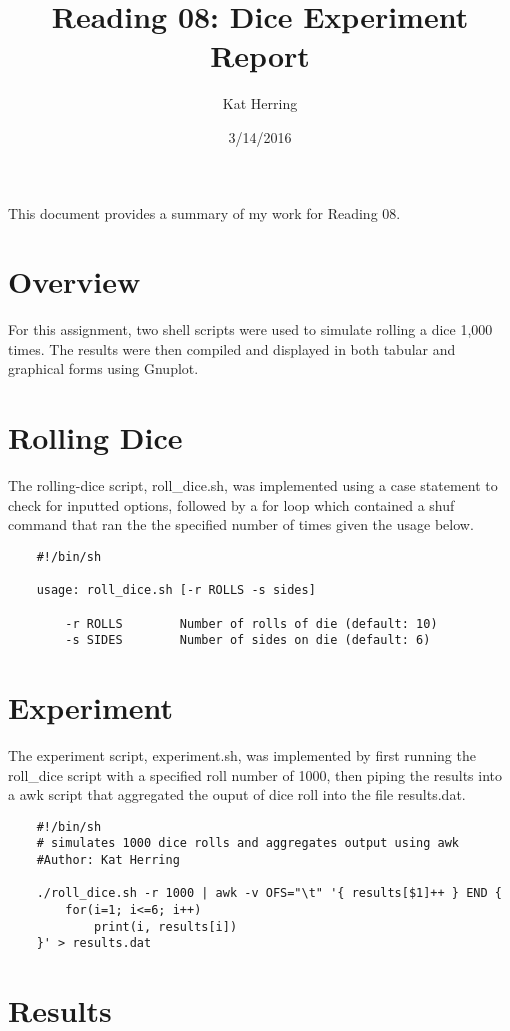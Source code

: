 \documentclass[letterpaper]{article}
\title{Reading 08: Dice Experiment Report}
\date{3/14/2016}
\author{Kat Herring}
\begin{document}
\maketitle

This document provides a summary of my work for Reading 08.

\section{Overview}

For this assignment, two shell scripts were used to simulate rolling a dice 1,000 times. The results were then compiled and displayed in both tabular and graphical forms using Gnuplot.

\section{Rolling Dice}

The rolling-dice script, roll\_dice.sh, was implemented using a case statement to check for inputted options, followed by a for loop which contained a shuf command that ran the the specified number of times given the usage below.

\begin{verbatim}
	#!/bin/sh

	usage: roll_dice.sh [-r ROLLS -s sides]

	    -r ROLLS        Number of rolls of die (default: 10)
	    -s SIDES        Number of sides on die (default: 6)
\end{verbatim}

\section{Experiment}

The experiment script, experiment.sh, was implemented by first running the roll\_dice script with a specified roll number of 1000, then piping the results into a awk script that aggregated the ouput of dice roll into the file results.dat.

\begin{verbatim}
	#!/bin/sh
	# simulates 1000 dice rolls and aggregates output using awk
	#Author: Kat Herring

	./roll_dice.sh -r 1000 | awk -v OFS="\t" '{ results[$1]++ } END { 
		for(i=1; i<=6; i++)
			print(i, results[i])
	}' > results.dat
\end{verbatim}

\section{Results}
\end{document}
